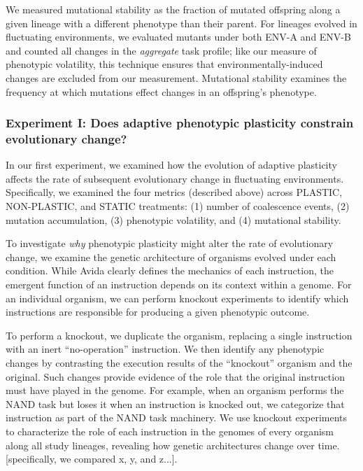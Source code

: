 We measured mutational stability as the fraction of mutated offspring along a given lineage with a different phenotype than their parent.
For lineages evolved in fluctuating environments, we evaluated mutants under both ENV-A and ENV-B and counted all changes in the \textit{aggregate} task profile; like our measure of phenotypic volatility, this technique ensures that environmentally-induced changes are excluded from our measurement.
Mutational stability examines the frequency at which mutations effect changes in an offspring's phenotype.

\vspace{1cm}
\subsubsection{Experiment I: Does adaptive phenotypic plasticity constrain evolutionary change?}
\label{sec:methods:experiment-evolutionary-dynamics}

In our first experiment, we examined how the evolution of adaptive plasticity affects the rate of subsequent evolutionary change in fluctuating environments.
Specifically, we examined the four metrics (described above) across PLASTIC, NON-PLASTIC, and STATIC treatments:
(1) number of coalescence events,
(2) mutation accumulation,
(3) phenotypic volatility,
and (4) mutational stability.

To investigate \textit{why} phenotypic plasticity might alter the rate of evolutionary change, we examine the genetic architecture of organisms evolved under each condition.
While Avida clearly defines the mechanics of each instruction, the emergent function of an instruction depends on its context within a genome. 
For an individual organism, we can perform knockout experiments to identify which instructions are responsible for producing a given phenotypic outcome.

To perform a knockout, we duplicate the organism, replacing a single instruction with an inert ``no-operation'' instruction.
We then identify any phenotypic changes by contrasting the execution results of the ``knockout'' organism and the original.
Such changes provide evidence of the role that the original instruction must have played in the genome.
For example, when an organism performs the NAND task but loses it when an instruction is knocked out, we categorize that instruction as part of the NAND task machinery.
We use knockout experiments to characterize the role of each instruction in the genomes of every organism along all study lineages, revealing how genetic architectures change over time.
[specifically, we compared x, y, and z...].

